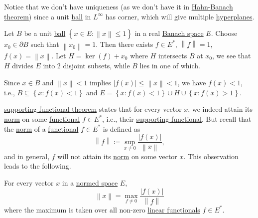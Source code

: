 Notice that we don't have uniqueness (as we don't have it in \hyperref[thm:Hahn-Banach]{Hahn-Banach theorem}) since a unit \hyperref[def:ball]{ball} in \(L^{\infty } \) has corner, which will give multiple \hyperref[def:hyperplane]{hyperplanes}.

\begin{remark}
	Let \(B\) be a unit \hyperref[def:ball]{ball} \(\left\{ x\in E \colon \left\lVert x\right\rVert \leq 1\right\} \) in a real \hyperref[def:Banach-space]{Banach space} \(E\). Choose \(x_0 \in \partial B\) such that \(\left\lVert x_0\right\rVert = 1\). Then there exists \(f\in E^{\ast} \), \(\left\lVert f\right\rVert = 1\), \(f(x) = \left\lVert x\right\rVert \). Let \(H = \ker(f) + x_0\) where \(H\) intersects \(B\) at \(x_0\), we see that \(H\) divides \(E\) into \(2\) disjoint subsets, while \(B\) lies in one of which.
\end{remark}
\begin{explanation}
	Since \(x\in B\) and \(\left\lVert x\right\rVert < 1\) implies \(\left\vert f(x) \right\vert \leq \left\lVert x\right\rVert < 1\), we have \(f(x) < 1\), i.e., \(B\subseteq \left\{ x\colon f(x) < 1 \right\} \) and \(E = \left\{ x\colon f(x) < 1 \right\} \cup H \cup \left\{ x\colon f(x) > 1 \right\}\).
\end{explanation}

\hyperref[thm:supporting-functional]{supporting-functional theorem} states that for every vector \(x\), we indeed attain its \hyperref[def:norm]{norm} on some \hyperref[def:linear-functional]{functional} \(f\in E^{\ast} \), i.e., their \hyperref[thm:supporting-functional]{supporting functional}. But recall that the \hyperref[def:norm]{norm} of a \hyperref[def:linear-functional]{functional} \(f\in E^{\ast} \) is defined as
\[
	\left\lVert f\right\rVert \coloneqq \sup _{x \neq 0}\frac{\left\vert f(x) \right\vert }{\left\lVert x\right\rVert },
\]
and in general, \(f\) will not attain its \hyperref[def:norm]{norm} on some vector \(x\). This observation leads to the following.

\begin{corollary}
	For every vector \(x\) in a \hyperref[def:normed-vector-space]{normed space} \(E\),
	\[
		\left\lVert x\right\rVert = \max _{f \neq 0}\frac{\left\vert f(x) \right\vert }{\left\lVert f\right\rVert }
	\]
	where the maximum is taken over all non-zero \hyperref[def:linear-functional]{linear functionals} \(f\in E^{\ast} \).
\end{corollary}

